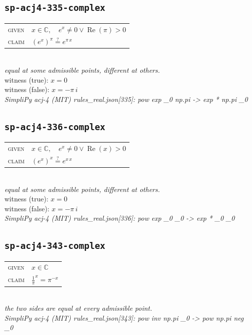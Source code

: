 \documentclass[11pt]{article}
\begin{document}
\subsection*{\texttt{sp-acj4-335-complex}}
\begin{tabular}{@{}l@{\quad}l@{}}
\textsc{given} & $x \in \mathbb{C},\quad e^{x} \neq 0 \lor \operatorname{Re}\left(\pi\right) > 0$ \\[4pt]
\textsc{claim} & $\displaystyle \left(e^{x}\right)^{\pi} \overset{?}{=} e^{\pi \, x}$ \\
\end{tabular}\\[2pt]
{\small\emph{equal at some admissible points, different at others.}}\\
{\footnotesize\color{gray}witness (true): $x = 0$}\\
{\footnotesize\color{gray}witness (false): $x = -\pi \, i$}\\
\emph{SimpliPy acj-4 (MIT) rules\_real.json[335]: pow exp \_0 np.pi  ->  exp * np.pi \_0}\\

\subsection*{\texttt{sp-acj4-336-complex}}
\begin{tabular}{@{}l@{\quad}l@{}}
\textsc{given} & $x \in \mathbb{C},\quad e^{x} \neq 0 \lor \operatorname{Re}\left(x\right) > 0$ \\[4pt]
\textsc{claim} & $\displaystyle \left(e^{x}\right)^{x} \overset{?}{=} e^{x \, x}$ \\
\end{tabular}\\[2pt]
{\small\emph{equal at some admissible points, different at others.}}\\
{\footnotesize\color{gray}witness (true): $x = 0$}\\
{\footnotesize\color{gray}witness (false): $x = -\pi \, i$}\\
\emph{SimpliPy acj-4 (MIT) rules\_real.json[336]: pow exp \_0 \_0  ->  exp * \_0 \_0}\\

\subsection*{\texttt{sp-acj4-343-complex}}
\begin{tabular}{@{}l@{\quad}l@{}}
\textsc{given} & $x \in \mathbb{C}$ \\[4pt]
\textsc{claim} & $\displaystyle \frac{1}{\pi}^{x} = \pi^{-x}$ \\
\end{tabular}\\[2pt]
{\small\emph{the two sides are equal at every admissible point.}}\\
\emph{SimpliPy acj-4 (MIT) rules\_real.json[343]: pow inv np.pi \_0  ->  pow np.pi neg \_0}\\
\end{document}
